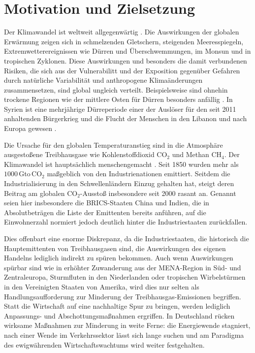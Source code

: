 \chapter{Motivation und Zielsetzung} \label{ch:motivation}

Der Klimawandel ist weltweit allgegenwärtig \citep{ipcc-2014}. Die Auswirkungen der globalen Erwärmung zeigen sich in schmelzenden Gletschern, steigenden Meeresspiegeln, Extremwetterereignissen wie Dürren und Überschwemmungen, im Monsun und in tropischen Zyklonen. Diese Auswirkungen und besonders die damit verbundenen Risiken, die sich aus der Vulnerabilitt und der Exposition gegenüber Gefahren durch natürliche Variabilität und anthropogene Klimaänderungen zusammensetzen, sind global ungleich verteilt. Beispielsweise sind ohnehin trockene Regionen wie der mittlere Osten für Dürren besonders anfällig \citep{ipcc-wg2-2014}. In Syrien ist eine mehrjährige Dürreperiode einer der Auslöser für den seit 2011 anhaltenden Bürgerkrieg und die Flucht der Menschen in den Libanon und nach Europa gewesen \citep{gleick-2014}.

Die Ursache für den globalen Temperaturanstieg sind in die Atmosphäre ausgestoßene Treibhausgase wie Kohlenstoffdioxid CO$_2$ und Methan CH$_4$. Der Klimawandel ist hauptsächlich menschengemacht \citep{ipcc-wg1-2013}. Seit 1850 wurden mehr als $1000$\,Gto\,CO$_2$ maßgeblich von den Industrienationen emittiert. Seitdem die Industrialisierung in den Schwellenländern Einzug gehalten hat, steigt deren Beitrag am globalen CO$_2$-Ausstoß insbesondere seit 2000 rasant an. Genannt seien hier insbesondere die BRICS-Staaten China und Indien, die in Absolutbeträgen die Liste der Emittenten bereits anführen, auf die Einwohnerzahl normiert jedoch deutlich hinter die Industriestaaten zurückfallen. \citep{ipcc-wg3-2014}

Dies offenbart eine enorme Diskrepanz, da die Industriestaaten, die historisch die Hauptemittenten von Treibhausgasen sind, die Auswirkungen des eigenen Handelns lediglich indirekt zu spüren bekommen. Auch wenn Auswirkungen spürbar sind wie in erhöhter Zuwanderung aus der MENA-Region in Süd- und Zentraleuropa, Sturmfluten in den Niederlanden oder tropischen Wirbelstürmen in den Vereinigten Staaten von Amerika, wird dies nur selten als Handlungsaufforderung zur Minderung der Treibhausgas-Emissionen begriffen. Statt die Wirtschaft auf eine nachhaltige Spur zu bringen, werden lediglich Anpassungs- und Abschottungsmaßnahmen ergriffen. In Deutschland rücken wirksame Maßnahmen zur Minderung in weite Ferne: die Energiewende stagniert, nach einer Wende im Verkehrssektor lässt sich lange suchen und am Paradigma des ewigwährenden Wirtschaftswachtums wird weiter festgehalten. 

